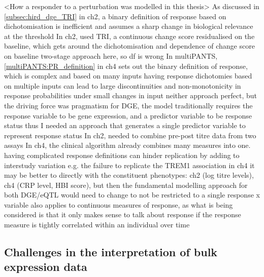 \begin{outline}
\1 <How a responder to a perturbation was modelled in this thesis>
    \2 As discussed in \autoref{subsec:hird_dge_TRI} in ch2, a binary definition of response based on dichotomisation is inefficient and assumes a sharp change in biological relevance at the threshold
    \2 In ch2, used \gls{TRI}, a continuous change score residualised on the baseline, which gets around the dichotomisation and dependence of change score on baseline
        \3 two-stage approach here, so df is wrong
    \2 In multiPANTS, \autoref{multiPANTS:PR_definition} in ch4 sets out the binary definition of response, which is complex and based on many inputs
        \3 having response dichotomies based on multiple inputs can lead to large discontinuities and non-monotonicity in response probabilities under small changes in input \autocite{senn2005DichotomaniaObsessiveCompulsive} 
    \2 neither approach perfect, but the driving force was pragmatism
        \3 for DGE, the model traditionally requires the response variable to be gene expression, and a predictor variable to be response status
        \3 thus I needed an approach that generates a single predictor variable to represent response status
        \3 In ch2, needed to combine pre-post titre data from two assays
        \3 In ch4, the clinical algorithm already combines many measures into one.
    \2 having complicated response definitions can hinder replication by adding to interstudy variation e.g. the failure to replicate the TREM1 association in ch4
    \2 it may be better to directly with the constituent phenotypes: ch2 (log titre levels), ch4 (CRP level, HBI score), but then the fundamental modelling approach for both DGE/eQTL would need to change to not be restricted to a single response x variable 
    \2 also applies to continuous measures of response, as what is being considered is that it only makes sense to talk about response if the response measure is tightly correlated within an individual over time


\subsection{Challenges in the interpretation of bulk expression data}


\end{outline}

